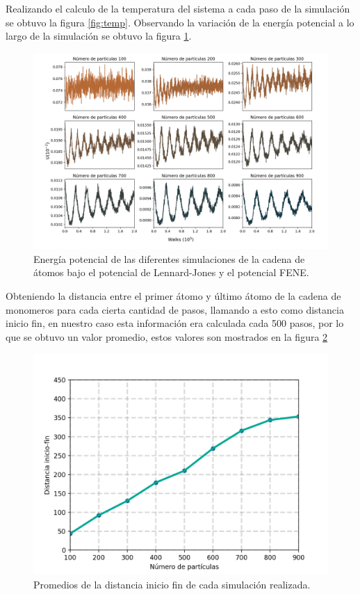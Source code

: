 Realizando el calculo de la temperatura del sistema a cada paso de la simulación se obtuvo la figura \ref{fig:temp}.
Observando la variación de la energía potencial a lo largo de la simulación se obtuvo la figura \ref{fig:energy}.
\begin{figure}[H]
    \includegraphics[scale=0.25]{../Graphics/energy.png}
    \caption{Energía potencial de las diferentes simulaciones de la cadena de átomos bajo el potencial de Lennard-Jones y el potencial FENE.}
    \label{fig:energy}
\end{figure}
Obteniendo la distancia entre el primer átomo y último átomo de la cadena de monomeros para cada cierta cantidad de pasos, llamando a esto
como distancia inicio fin, en nuestro caso esta información era calculada
cada 500 pasos, por lo que se obtuvo un valor promedio, estos valores son mostrados en la figura \ref{eq:dis}
\begin{figure}[H]
    \centering
    \includegraphics[scale=0.5]{../Graphics/dis.png}
    \caption{Promedios de la distancia inicio fin de cada simulación realizada.}
    \label{eq:dis}
\end{figure}